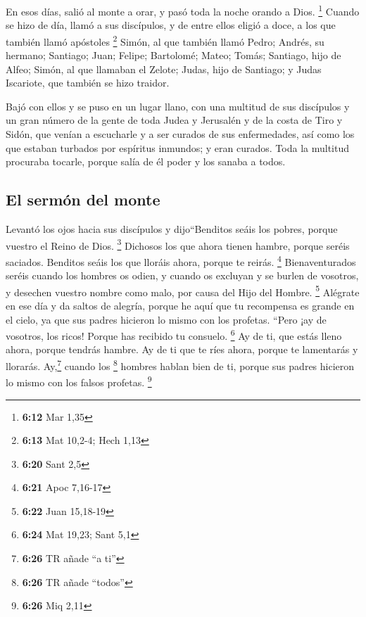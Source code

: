  En esos días, salió al monte a orar, y pasó toda la
noche orando a Dios. \footnote{\textbf{6:12} Mar 1,35} 
Cuando se hizo de día, llamó a sus discípulos, y de entre ellos eligió a
doce, a los que también llamó apóstoles \footnote{\textbf{6:13} Mat
  10,2-4; Hech 1,13}  Simón, al que también llamó Pedro;
Andrés, su hermano; Santiago; Juan; Felipe; Bartolomé; 
Mateo; Tomás; Santiago, hijo de Alfeo; Simón, al que llamaban el Zelote;
 Judas, hijo de Santiago; y Judas Iscariote, que también
se hizo traidor.

 Bajó con ellos y se puso en un lugar llano, con una
multitud de sus discípulos y un gran número de la gente de toda Judea y
Jerusalén y de la costa de Tiro y Sidón, que venían a escucharle y a ser
curados de sus enfermedades,  así como los que estaban
turbados por espíritus inmundos; y eran curados.  Toda la
multitud procuraba tocarle, porque salía de él poder y los sanaba a
todos.

\hypertarget{el-sermuxf3n-del-monte}{%
\subsection{El sermón del monte}\label{el-sermuxf3n-del-monte}}

 Levantó los ojos hacia sus discípulos y dijo``Benditos
seáis los pobres, porque vuestro el Reino de Dios. \footnote{\textbf{6:20}
  Sant 2,5}  Dichosos los que ahora tienen hambre, porque
seréis saciados. Benditos seáis los que lloráis ahora, porque te reirás.
\footnote{\textbf{6:21} Apoc 7,16-17}  Bienaventurados
seréis cuando los hombres os odien, y cuando os excluyan y se burlen de
vosotros, y desechen vuestro nombre como malo, por causa del Hijo del
Hombre. \footnote{\textbf{6:22} Juan 15,18-19}  Alégrate
en ese día y da saltos de alegría, porque he aquí que tu recompensa es
grande en el cielo, ya que sus padres hicieron lo mismo con los
profetas.  ``Pero ¡ay de vosotros, los ricos! Porque has
recibido tu consuelo. \footnote{\textbf{6:24} Mat 19,23; Sant 5,1}
 Ay de ti, que estás lleno ahora, porque tendrás hambre.
Ay de ti que te ríes ahora, porque te lamentarás y llorarás.
 Ay,\footnote{\textbf{6:26} TR añade ``a ti''} cuando los
\footnote{\textbf{6:26} TR añade ``todos''} hombres hablan bien de ti,
porque sus padres hicieron lo mismo con los falsos profetas. \footnote{\textbf{6:26}
  Miq 2,11}

